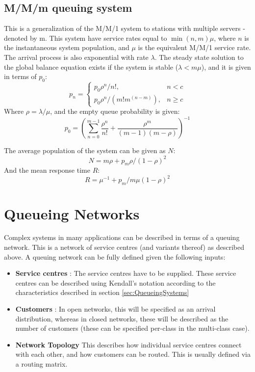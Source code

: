 \subsection{M/M/m queuing system} \label{sec:MMmQsystem}
This is a generalization of the M/M/1 system to stations with multiple servers - denoted by m. This system have service rates equal to \(\min(n,m)\mu\), where \(n\) is the instantaneous system population, and \(\mu\) is the equivalent M/M/1 service rate. The arrival process is also exponential with rate \(\lambda\). The steady state solution to the global balance equation exists if the system is stable (\(\lambda < m\mu\)), and it is given in terms of \(p_0\):
\begin{equation*}
    p_n=
    \begin{cases}
        p_0 \rho^n/n!, & n < c\\
        p_0 \rho^n/(m!m^{(n-m)}), & n \geq c
    \end{cases}
\end{equation*}
Where \(\rho = \lambda/\mu\), and the empty queue probability is given:
\[p_0 = (\sum_{n=0}^{m-1} \frac{\rho ^ n}{n!} + \frac{\rho ^ m}{(m-1)(m-\rho)})^{-1}\]

The average population of the system can be given as \(N\):
\[N = m \rho + p_m \rho / (1 - \rho)^2\]
And the mean response time \(R\):
\[R = \mu^{-1} + p_m / m \mu (1 - \rho)^2\]


\section{Queueing Networks}\label{sec:QNetworks}

Complex systems in many applications can be described in terms of a queuing network. This is a network of service centres (and variants thereof) as described above. A queuing network can be fully defined given the following inputs:
\begin{itemize}
    \item \textbf{Service centres} : The service centres have to be supplied. These service centres can be described using Kendall's notation according to the characteristics described in section \ref{sec:QueueingSystems}
    \item \textbf{Customers} : In open networks, this will be specified as an arrival distribution, whereas in closed networks, these will be described as the number of customers (these can be specified per-class in the multi-class case).
    \item \textbf{Network Topology} This describes how individual service centres connect with each other, and how customers can be routed. This is usually defined via a routing matrix. 
\end{itemize}

